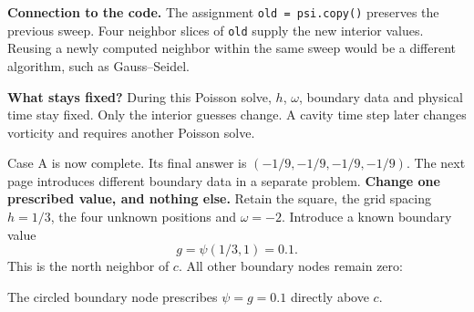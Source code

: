 \textbf{Connection to the code.} The assignment \texttt{old = psi.copy()}
preserves the previous sweep. Four neighbor slices of \texttt{old} supply the
new interior values. Reusing a newly computed neighbor within the same sweep
would be a different algorithm, such as Gauss--Seidel.

\textbf{What stays fixed?} During this Poisson solve, $h$, $\omega$, boundary
data and physical time stay fixed. Only the interior guesses change. A cavity
time step later changes vorticity and requires another Poisson solve.

Case A is now complete. Its final answer is $(-1/9,-1/9,-1/9,-1/9)$.
The next page introduces different boundary data in a separate problem.
\newpage
{}
\textbf{Change one prescribed value, and nothing else.}
Retain the square, the grid spacing $h=1/3$, the four unknown positions and
$\omega=-2$. Introduce a known boundary value
\[
\boxed{g=\psi(1/3,1)=0.1.}
\]
This is the north neighbor of $c$. All other boundary nodes remain zero:
\begin{center}
\end{center}
The circled boundary node prescribes $\psi=g=0.1$ directly above $c$.

